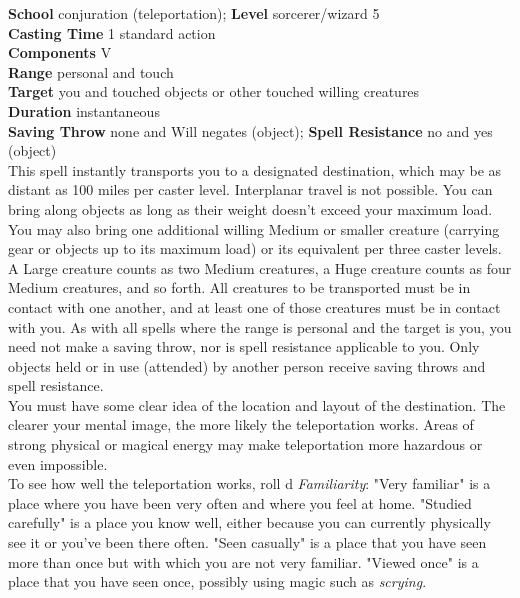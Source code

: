 \textbf{School} conjuration (teleportation); \textbf{Level} sorcerer/wizard 5\\
\textbf{Casting Time} 1 standard action\\
\textbf{Components} V\\
\textbf{Range} personal and touch\\
\textbf{Target} you and touched objects or other touched willing creatures\\
\textbf{Duration} instantaneous\\
\textbf{Saving Throw} none and Will negates (object); \textbf{Spell Resistance} no and yes (object)\\
This spell instantly transports you to a designated destination, which may be as distant as 100 miles per caster level. Interplanar travel is not possible. You can bring along objects as long as their weight doesn't exceed your maximum load. You may also bring one additional willing Medium or smaller creature (carrying gear or objects up to its maximum load) or its equivalent per three caster levels. A Large creature counts as two Medium creatures, a Huge creature counts as four Medium creatures, and so forth. All creatures to be transported must be in contact with one another, and at least one of those creatures must be in contact with you. As with all spells where the range is personal and the target is you, you need not make a saving throw, nor is spell resistance applicable to you. Only objects held or in use (attended) by another person receive saving throws and spell resistance.\\
You must have some clear idea of the location and layout of the destination. The clearer your mental image, the more likely the teleportation works. Areas of strong physical or magical energy may make teleportation more hazardous or even impossible.\\
To see how well the teleportation works, roll d%
\textit{Familiarity}: "Very familiar" is a place where you have been very often and where you feel at home. "Studied carefully" is a place you know well, either because you can currently physically see it or you've been there often. "Seen casually" is a place that you have seen more than once but with which you are not very familiar. "Viewed once" is a place that you have seen once, possibly using magic such as \textit{scrying}. \\

